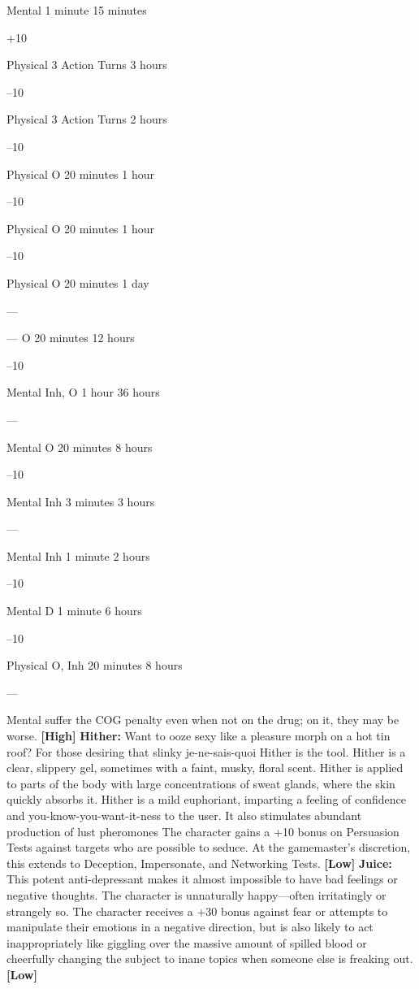 Mental
1 minute
15 minutes

+10

Physical
3 Action Turns
3 hours

–10

Physical
3 Action Turns
2 hours

–10

Physical
O
20 minutes
1 hour

–10

Physical
O
20 minutes
1 hour

–10

Physical
O
20 minutes
1 day

—

—
O
20 minutes
12 hours

–10

Mental
Inh, O
1 hour
36 hours

—

Mental
O
20 minutes
8 hours

–10

Mental
Inh
3 minutes
3 hours

—

Mental
Inh
1 minute
2 hours

–10

Mental
D
1 minute
6 hours

–10

Physical
O, Inh
20 minutes
8 hours

—

Mental
suffer the COG penalty even when not on the drug; 
on it, they may be worse. \textbf{[High]}
\textbf{Hither:} Want to ooze sexy like a pleasure morph 
on a hot tin roof? For those desiring that slinky je-ne-sais-quoi
Hither is the tool. Hither is a clear, slippery
gel, sometimes with a faint, musky, floral scent. Hither 
is applied to parts of the body with large concentrations
of sweat glands, where the skin quickly absorbs
it. Hither is a mild euphoriant, imparting a feeling of 
confidence and you-know-you-want-it-ness to the user. 
It also stimulates abundant production of lust pheromones
The character gains a +10 bonus on Persuasion
Tests against targets who are possible to seduce. At the 
gamemaster's discretion, this extends to Deception, 
Impersonate, and Networking Tests. \textbf{[Low]}
\textbf{Juice:} This potent anti-depressant makes it almost 
impossible to have bad feelings or negative thoughts. 
The character is unnaturally happy—often irritatingly 
or strangely so. The character receives a +30 bonus 
against fear or attempts to manipulate their emotions 
in a negative direction, but is also likely to act inappropriately
like giggling over the massive amount of
spilled blood or cheerfully changing the subject to 
inane topics when someone else is freaking out. \textbf{[Low]}

